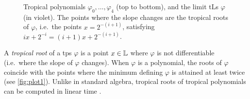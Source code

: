 \begin{wrapfigure}{r}{0.5\textwidth}%
\caption{\small Tropical polynomials $\varphi_0,\dots,\varphi_4$ (top to bottom), and the limit tLs $\varphi$ (in violet). The points where the slope changes are  the tropical roots of $\varphi$, i.e.~the points $x=2^{-(i+1)}$, satisfying $ix+2^{-i}=(i+1)x+2^{-(i+1)}$.}
\label{fig:plot1}%
\end{wrapfigure} %

A \emph{tropical root} of a tps $\varphi$ is a point $x\in \mathbb{L}$ where $\varphi$ is not differentiable (i.e.~where the slope of $\varphi$ changes). When $\varphi$ is a polynomial, the roots of $\varphi$ coincide with the points where the minimum defining $\varphi$ is attained at least twice (see \autoref{fig:plot1}).
Unlike in standard algebra, tropical roots of tropical polynomials can be computed in linear time \cite{Noferini2015}. 


%



